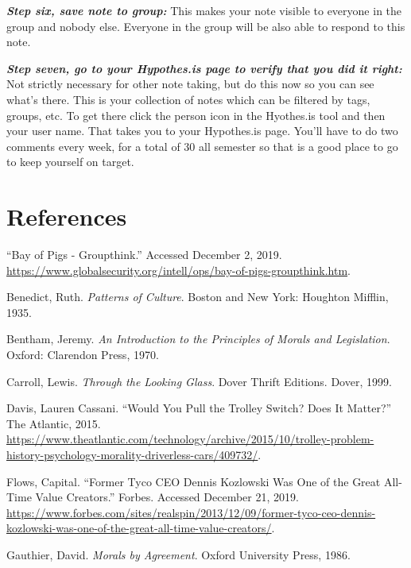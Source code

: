 \documentclass[12pt, openany]{book}
\begin{document}
\textbf{\emph{Step six, save note to group:}} This makes your note visible to everyone in the group and nobody else. Everyone in the group will be also able to respond to this note.

\textbf{\emph{Step seven, go to your Hypothes.is page to verify that you did it right:}} Not strictly necessary for other note taking, but do this now so you can see what's there. This is your collection of notes which can be filtered by tags, groups, etc. To get there click the person icon in the Hyothes.is tool and then your user name. That takes you to your Hypothes.is page. You'll have to do two comments every week, for a total of 30 all semester so that is a good place to go to keep yourself on target.

\hypertarget{references}{%
\chapter*{References}\label{references}}


\hypertarget{refs}{}
\leavevmode\hypertarget{ref-BayPigsGroupthink}{}%
``Bay of Pigs - Groupthink.'' Accessed December 2, 2019. \url{https://www.globalsecurity.org/intell/ops/bay-of-pigs-groupthink.htm}.

\leavevmode\hypertarget{ref-benedictPatternsCulture1935}{}%
Benedict, Ruth. \emph{Patterns of Culture}. Boston and New York: Houghton Mifflin, 1935.

\leavevmode\hypertarget{ref-benthamIntroductionPrinciplesMorals1970}{}%
Bentham, Jeremy. \emph{An Introduction to the Principles of Morals and Legislation}. Oxford: Clarendon Press, 1970.

\leavevmode\hypertarget{ref-carrollLookingGlass1999}{}%
Carroll, Lewis. \emph{Through the Looking Glass}. Dover Thrift Editions. Dover, 1999.

\leavevmode\hypertarget{ref-davisWouldYouPull2015}{}%
Davis, Lauren Cassani. ``Would You Pull the Trolley Switch? Does It Matter?'' The Atlantic, 2015. \url{https://www.theatlantic.com/technology/archive/2015/10/trolley-problem-history-psychology-morality-driverless-cars/409732/}.

\leavevmode\hypertarget{ref-flowsFormerTycoCEO}{}%
Flows, Capital. ``Former Tyco CEO Dennis Kozlowski Was One of the Great All-Time Value Creators.'' Forbes. Accessed December 21, 2019. \url{https://www.forbes.com/sites/realspin/2013/12/09/former-tyco-ceo-dennis-kozlowski-was-one-of-the-great-all-time-value-creators/}.

\leavevmode\hypertarget{ref-gauthierMoralsAgreement1986}{}%
Gauthier, David. \emph{Morals by Agreement}. Oxford University Press, 1986.
\end{document}
